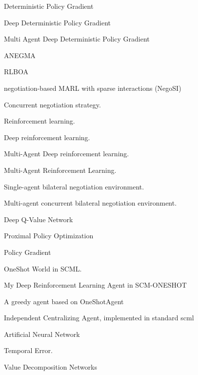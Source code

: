 %
{%
Deterministic Policy Gradient
}

%
{%
Deep Deterministic Policy Gradient
}

%
{%
Multi Agent Deep Deterministic Policy Gradient
}

%
{%
ANEGMA
}

%
{%
RLBOA
}

%
{%
negotiation-based MARL with sparse interactions (NegoSI)
}

%
{%
Concurrent negotiation strategy.
}

%
{%
Reinforcement learning.
}

%
{%
Deep reinforcement learning.
}

%
{%
Multi-Agent Deep reinforcement learning.
}

%
{%
Multi-Agent Reinforcement Learning.
}

%
{%
Single-agent bilateral negotiation environment.
}

%
{%
Multi-agent concurrent bilateral negotiation environment.
}

%
{%
Deep Q-Value Network
}

%
{%
Proximal Policy Optimization
}

%
{%
Policy Gradient
}

%
{%
OneShot World in SCML.
}

%
{%
My Deep Reinforcement Learning Agent in SCM-ONESHOT
}

%
{%
A greedy agent based on OneShotAgent
}

%
{%
Independent Centralizing Agent, implemented in standard scml
}

%
{%
Artificial Neural Network
}

%
{%
Temporal Error.
}

%
{%
Value Decomposition Networks
}


